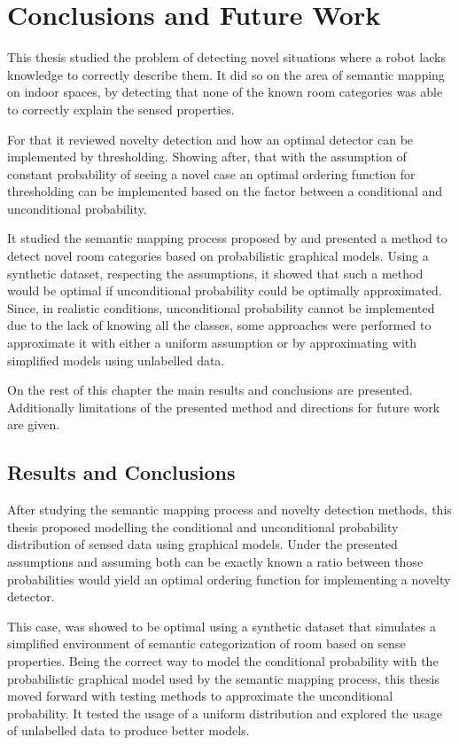 \chapter{Conclusions and Future Work}\label{chap:conclusions}

This thesis studied the problem of detecting novel situations where a robot lacks knowledge to
correctly describe them.
It did so on the area of semantic mapping on indoor spaces, by detecting that none of the known room
categories was able to correctly explain the sensed properties.

For that it reviewed novelty detection and how an optimal detector can be implemented by
thresholding. Showing after, that with the assumption of constant probability of seeing a
novel case an optimal ordering function for thresholding can be implemented based on
the factor between a conditional and unconditional probability.

It studied the semantic mapping process proposed by \cite{pronobis2011semmap} and presented a method
to detect novel room categories based on probabilistic graphical models.
Using a synthetic dataset, respecting the assumptions, it showed that such a method would be optimal
if unconditional probability could be optimally approximated.
Since, in realistic conditions, unconditional probability cannot be implemented due to the lack of
knowing all the classes, some approaches were performed to approximate it with either a uniform
assumption or by approximating with simplified models using unlabelled data.

On the rest of this chapter the main results and conclusions are presented.
Additionally limitations of the presented method and directions for future work are given.


\section{Results and Conclusions}

After studying the semantic mapping process and novelty detection methods, this
thesis proposed modelling the conditional and unconditional probability distribution of sensed
data using graphical models. Under the presented assumptions and assuming both can be exactly known
a ratio between those probabilities would yield an optimal ordering function for implementing a
novelty detector.

This case, was showed to be optimal using a synthetic dataset that simulates a simplified
environment of semantic categorization of room based on sense properties.
Being the correct way to model the conditional probability with the probabilistic graphical model
used by the semantic mapping process, this thesis moved forward with testing methods to approximate
the unconditional probability. It tested the usage of a uniform distribution and explored the usage
of unlabelled data to produce better models.

